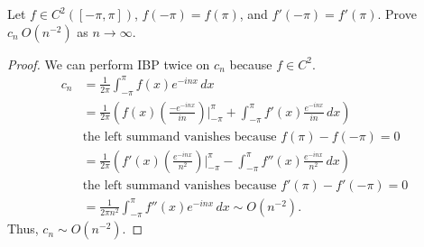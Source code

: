 \documentclass[../hw5]{subfiles}
\begin{document}
\begin{problem}
Let $f\in C^2([-\pi,\pi])$, $f(-\pi)=f(\pi)$, and $f'(-\pi)=f'(\pi)$.
Prove $c_n ~ O(n^{-2})$ as $n\to \infty$.
\end{problem}
\begin{proof}
	We can perform IBP twice on $c_n$ because $f\in C^2$.
	\begin{align*}
		c_n & = \frac{1}{2\pi}\int_{-\pi}^{\pi} f(x)e^{-inx} \,dx                                                                                               \\
		    & = \frac{1}{2\pi}\left( f(x)\left( \frac{-e^{-inx}}{in} \right)\bigg\vert_{-\pi}^{\pi}   +\int_{-\pi}^{\pi} f'(x) \frac{e^{-inx}}{in}\,dx\right)   \\
		    & \text{the left summand vanishes because $f(\pi)-f(-\pi)=0$}                                                                                       \\
		    & = \frac{1}{2\pi}\left( f'(x)\left( \frac{e^{-inx}}{n^2} \right)\bigg\vert_{-\pi}^{\pi}  -\int_{-\pi}^{\pi} f''(x) \frac{e^{-inx}}{n^2}\,dx\right) \\
		    & \text{the left summand vanishes because $f'(\pi)-f'(-\pi)=0$}                                                                                     \\
		    & = \frac{1}{2\pi n^2}\int_{-\pi}^{\pi} f''(x)e^{-inx} \,dx  \sim O(n^{-2})
		.\end{align*}
	Thus, $c_n \sim O(n^{-2})$.
\end{proof}
\end{document}
